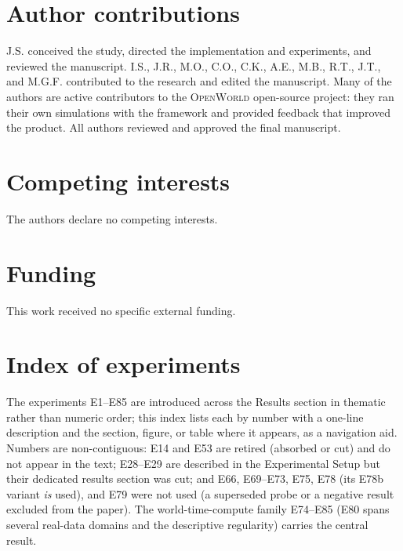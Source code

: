 \documentclass[11pt]{article}
\newcommand{\openworld}{\textsc{OpenWorld}}
\begin{document}
\section*{Author contributions}
J.S. conceived the study, directed the implementation and experiments, and
reviewed the manuscript. I.S., J.R., M.O., C.O., C.K., A.E., M.B., R.T., J.T., and M.G.F.
contributed to the research and edited the manuscript. Many of the authors are
active contributors to the \openworld{} open-source project: they ran their own
simulations with the framework and provided feedback that improved the product.
All authors reviewed and approved the final manuscript.

\section*{Competing interests}
The authors declare no competing interests.

\section*{Funding}
This work received no specific external funding.

\appendix
\section{Index of experiments}\label{app:experiment-index}
The experiments E1--E85 are introduced across the Results section in thematic
rather than numeric order; this index lists each by number with a one-line
description and the section, figure, or table where it appears, as a navigation
aid. Numbers are non-contiguous: E14 and E53 are retired (absorbed or cut) and
do not appear in the text; E28--E29 are described in the Experimental Setup but
their dedicated results section was cut; and E66, E69--E73, E75, E78 (its E78b
variant \emph{is} used), and E79 were not used (a superseded probe or a negative
result excluded from the paper).
The world-time-compute family E74--E85 (E80 spans several real-data domains and
the descriptive regularity) carries the central result.
\end{document}

